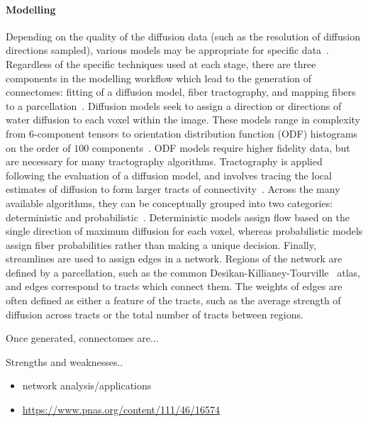 \paragraph*{Modelling}
Depending on the quality of the diffusion data (such as the resolution of diffusion directions sampled), various models
may be appropriate for specific data~\cite{jeurissen2019diffusion,tournier2011diffusion,mori2013introduction}.
Regardless of the specific techniques used at each stage, there are three components in the modelling workflow which
lead to the generation of connectomes: fitting of a diffusion model, fiber tractography, and mapping fibers to a
parcellation~\cite{roncal2013migraine,sporns2005human,Kiar2018-jt,Glasser2013-vf}. Diffusion models seek to assign a
direction or directions of water diffusion to each voxel within the image. These models range in complexity from
$6$-component tensors to orientation distribution function (ODF) histograms on the order of $100$
components~\cite{tournier2011diffusion}. ODF models require higher fidelity data, but are necessary for many
tractography algorithms. Tractography is applied following the evaluation of a diffusion model, and involves tracing
the local estimates of diffusion to form larger tracts of connectivity~\cite{behrens2014mr}. Across the many available
algorithms, they can be conceptually grouped into two categories: deterministic and
probabilistic~\cite{jeurissen2019diffusion}. Deterministic models assign flow based on the single direction of maximum
diffusion for each voxel, whereas probabilistic models assign fiber probabilities rather than making a unique decision.
Finally, streamlines are used to assign edges in a network. Regions of the network are defined by a parcellation, such
as the common Desikan-Killianey-Tourville~\cite{Klein2012-vi} atlas, and edges correspond to tracts which connect them.
The weights of edges are often defined as either a feature of the tracts, such as the average strength of diffusion
across tracts or the total number of tracts between regions.

Once generated, connectomes are...

Strengths and weaknesses..

\begin{itemize}
\item network analysis/applications
\item \url{https://www.pnas.org/content/111/46/16574}
\end{itemize}


